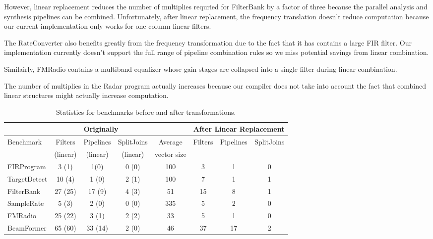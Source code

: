 However, linear replacement reduces the number of multiplies 
requried for FilterBank by a factor of three because the parallel analysis and 
synthesis pipelines can be combined. Unfortunately, after
linear replacement, the frequency translation doesn't reduce computation 
because our current implementation only works for one column linear filters.

The RateConverter also benefits greatly from the frequency transformation
due to the fact that it has contains a large FIR filter. Our implementation
currently doesn't support the full range of pipeline combination rules so
we miss potential savings from linear combination.

Similairly, FMRadio contains a multiband equalizer whose gain stages are collapsed
into a single filter during linear combination.

The number of multiplies in the Radar program actually increases because our 
compiler does not take into account the fact that combined linear structures 
might actually increase computation. %


\begin{table*}[t]
\begin{tabular}{|l|c|c|c||c||c|c|c|} 
\hline
          & \multicolumn{3}{|c||}{Originally}  &             & \multicolumn{3}{|c|}{After Linear Replacement} \\
\hline
Benchmark & Filters & Pipelines & SplitJoins & Average     & Filters      & Pipelines         & SplitJoins \\
          & (linear)& (linear)  & (linear)   & vector size &              &                   &            \\
\hline
FIRProgram & 3 (1) & 1(0) & 0 (0) & 100 & 3 & 1 & 0 \\
\hline
TargetDetect & 10 (4) & 1 (0) & 2 (1) & 100 & 7 & 1 & 1 \\
\hline
FilterBank & 27 (25) & 17 (9) & 4 (3) & 51 & 15 & 8 & 1 \\
\hline
SampleRate & 5 (3) & 2 (0) & 0 (0) & 335 & 5 & 2 & 0 \\
\hline
FMRadio & 25 (22) & 3 (1) & 2 (2) & 33 & 5 & 1 & 0 \\
\hline
BeamFormer & 65 (60) & 33 (14) & 2 (0) & 46 & 37 & 17 & 2\\
\hline
\end{tabular}
\caption{Statistics for benchmarks before and after transformations.}
\label{fig:benchmark-stastics}
\end{table*}
